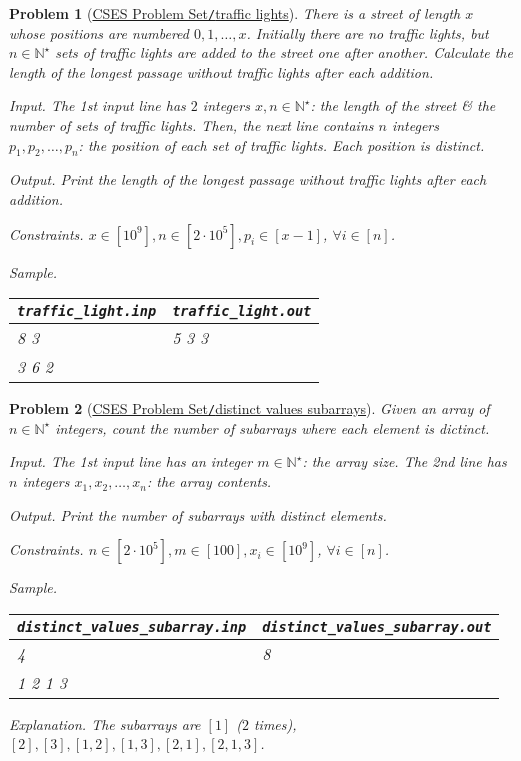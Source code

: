 \documentclass{article}
\newtheorem{problem}{Problem}
\begin{document}
\begin{problem}[\href{https://cses.fi/problemset/task/1163}{CSES Problem Set{\tt/}traffic lights}]
    There is a street of length $x$ whose positions are numbered $0,1,\ldots,x$. Initially there are no traffic lights, but $n\in\mathbb{N}^\star$ sets of traffic lights are added to the street one after another. Calculate the length of the longest passage without traffic lights after each addition.
    \item {\sf Input.} The 1st input line has $2$ integers $x,n\in\mathbb{N}^\star$: the length of the street \& the number of sets of traffic lights. Then, the next line contains $n$ integers $p_1,p_2,\ldots,p_n$: the position of each set of traffic lights. Each position is distinct.
    \item {\sf Output.} Print the length of the longest passage without traffic lights after each addition.
    \item {\sf Constraints.} $x\in[10^9],n\in[2\cdot10^5],p_i\in[x - 1]$, $\forall i\in[n]$.
    \item {\sf Sample.}
    \begin{table}[H]
        \centering
        \begin{tabular}{|l|l|}
            \hline
            \verb|traffic_light.inp| & \verb|traffic_light.out| \\
            \hline
            8 3 & 5 3 3 \\
            3 6 2 & \\
            \hline
        \end{tabular}
    \end{table}
\end{problem}

\begin{problem}[\href{https://cses.fi/problemset/task/3420}{CSES Problem Set{\tt/}distinct values subarrays}]
    Given an array of $n\in\mathbb{N}^\star$ integers, count the number of subarrays where each element is dictinct.
    \item {\sf Input.} The 1st input line has an integer $m\in\mathbb{N}^\star$: the array size. The 2nd line has $n$ integers $x_1,x_2,\ldots,x_n$: the array contents.
    \item {\sf Output.} Print the number of subarrays with distinct elements.
    \item {\sf Constraints.} $n\in[2\cdot10^5],m\in[100],x_i\in[10^9]$, $\forall i\in[n]$.
    \item {\sf Sample.}
    \begin{table}[H]
        \centering
        \begin{tabular}{|l|l|}
            \hline
            \verb|distinct_values_subarray.inp| & \verb|distinct_values_subarray.out| \\
            \hline
            4 & 8 \\
            1 2 1 3 & \\
            \hline
        \end{tabular}
    \end{table}
    \item {\sf Explanation.} The subarrays are $[1]$ ($2$ times), $[2],[3],[1,2],[1,3],[2,1],[2,1,3]$.
\end{problem}
\end{document}
